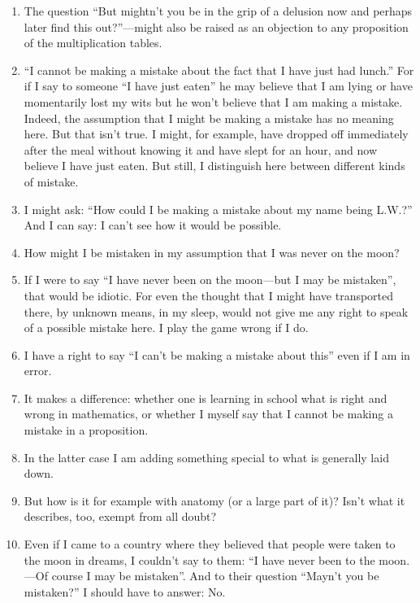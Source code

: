 \documentclass{book}
\begin{document}
\begin{enumerate}
\item
The question ``But mightn't you be in the grip of a delusion now and perhaps
later find this out?''---might also be raised as an objection to any
proposition of the multiplication tables.

\item
``I cannot be making a mistake about the fact that I have just had lunch.'' For
if I say to someone ``I have just eaten'' he may believe that I am lying or
have momentarily lost my wits but he won't believe that I am making a mistake.
Indeed, the assumption that I might be making a mistake has no meaning here.
But that isn't true. I might, for example, have dropped off immediately after
the meal without knowing it and have slept for an hour, and now believe I have
just eaten.  But still, I distinguish here between different kinds of mistake.

\item
I might ask: ``How could I be making a mistake about my name being L.W.?'' And
I can say: I can't see how it would be possible.

\item
How might I be mistaken in my assumption that I was never on the moon?

\item
If I were to say ``I have never been on the moon---but I may be mistaken'',
that would be idiotic.  For even the thought that I might have transported
there, by unknown means, in my sleep, would not give me any right to speak of a
possible mistake here. I play the game wrong if I do.

\item
I have a right to say ``I can't be making a mistake about this'' even if I am
in error.

\item
It makes a difference: whether one is learning in school what is right and
wrong in mathematics, or whether I myself say that I cannot be making a mistake
in a proposition.

\item
In the latter case I am adding something special to what is generally laid
down.

\item
But how is it for example with anatomy (or a large part of it)? Isn't what it
describes, too, exempt from all doubt?

\item
Even if I came to a country where they believed that people were taken to the
moon in dreams, I couldn't say to them: ``I have never been to the moon.---Of
course I may be mistaken''. And to their question ``Mayn't you be mistaken?'' I
should have to answer: No.


\end{enumerate}
\end{document}
